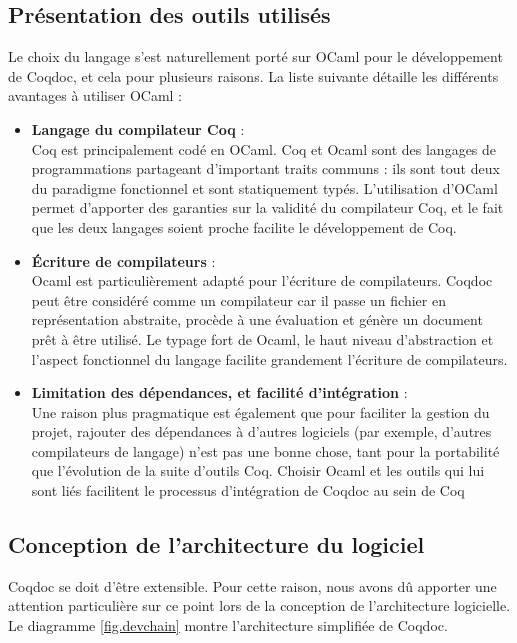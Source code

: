 \documentclass[a4paper, 11pt]{report}
\begin{document}
    \subsection{Présentation des outils utilisés}
    Le choix du langage s'est naturellement porté sur OCaml pour le
    développement de Coqdoc, et cela pour plusieurs raisons. La liste
    suivante détaille les différents avantages à utiliser OCaml :
    \begin{itemize}
      \item \textbf{Langage du compilateur Coq} : \\
        Coq est principalement codé en OCaml. Coq et Ocaml sont des langages
        de programmations partageant d'important traits communs : ils sont tout
        deux du paradigme fonctionnel et sont statiquement typés. L'utilisation
        d'OCaml permet d'apporter des garanties sur la validité du compilateur
        Coq, et le fait que les deux langages soient proche facilite le
        développement de Coq.
      \item \textbf{Écriture de compilateurs} : \\
        Ocaml est particulièrement adapté pour l'écriture de compilateurs.
        Coqdoc peut être considéré comme un compilateur car il passe un fichier
        en représentation abstraite, procède à une évaluation et génère un
        document prêt à être utilisé. Le typage fort de Ocaml, le haut niveau
        d'abstraction et l'aspect fonctionnel du langage facilite grandement
        l'écriture de compilateurs.
      \item \textbf{Limitation des dépendances, et facilité d'intégration} : \\
        Une raison plus pragmatique est également que pour faciliter la gestion
        du projet, rajouter des dépendances à d'autres logiciels (par exemple,
        d'autres compilateurs de langage) n'est pas une bonne chose, tant pour
        la portabilité que l'évolution de la suite d'outils Coq. Choisir
        Ocaml et les outils qui lui sont liés facilitent le processus
        d'intégration de Coqdoc au sein de Coq
    \end{itemize}
    \subsection{Conception de l'architecture du logiciel}
    Coqdoc se doit d'être extensible. Pour cette raison, nous avons dû apporter
    une attention particulière sur ce point lors de la conception de
    l'architecture logicielle.
    Le diagramme \cref{fig.devchain} montre l'architecture simplifiée de Coqdoc.
\end{document}
